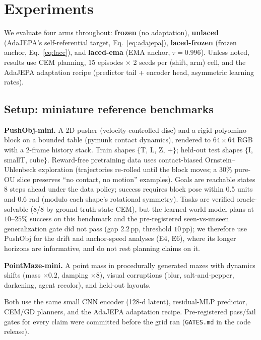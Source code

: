 \documentclass{article}
\begin{document}
\section{Experiments}
\label{sec:experiments}


We evaluate four arms throughout: \textbf{frozen} (no adaptation),
\textbf{unlaced} (AdaJEPA's self-referential target,
Eq.~\ref{eq:adajepa}), \textbf{laced-frozen} (frozen anchor,
Eq.~\ref{eq:lace}), and \textbf{laced-ema} (EMA anchor, $\tau{=}0.996$).
Unless noted, results use CEM planning, 15 episodes $\times$ 2 seeds per
(shift, arm) cell, and the AdaJEPA adaptation recipe (predictor tail +
encoder head, asymmetric learning rates).

\subsection{Setup: miniature reference benchmarks}
\label{sec:setup}

\textbf{PushObj-mini.} A 2D pusher (velocity-controlled disc) and a rigid
polyomino block on a bounded table (pymunk contact dynamics), rendered to
$64{\times}64$ RGB with a 2-frame history stack. Train shapes
$\{$T, L, Z, $+\}$; held-out test shapes $\{$I, smallT, cube$\}$. Reward-free
pretraining data uses contact-biased Ornstein--Uhlenbeck exploration
(trajectories re-rolled until the block moves; a 30\% pure-OU slice preserves
``no contact, no motion'' examples). Goals are reachable states 8 steps ahead
under the data policy; success requires block pose within 0.5 units and 0.6
rad (modulo each shape's rotational symmetry). Tasks are verified
oracle-solvable (8/8 by ground-truth-state CEM), but the learned world model
plans at $10$--$25\%$ success on this benchmark and the pre-registered
seen-vs-unseen generalization gate did not pass (gap $2.2$\,pp, threshold
$10$\,pp); we therefore use PushObj for the drift and anchor-speed analyses
(E4, E6), where its longer horizons are informative, and do not rest planning
claims on it.

\textbf{PointMaze-mini.} A point mass in procedurally generated mazes with
dynamics shifts (mass $\times 0.2$, damping $\times 8$), visual corruptions
(blur, salt-and-pepper, darkening, agent recolor), and held-out layouts.

Both use the same small CNN encoder (128-d latent), residual-MLP predictor,
CEM/GD planners, and the AdaJEPA adaptation recipe. Pre-registered pass/fail
gates for every claim were committed before the grid ran
(\texttt{GATES.md} in the code release).
\end{document}
